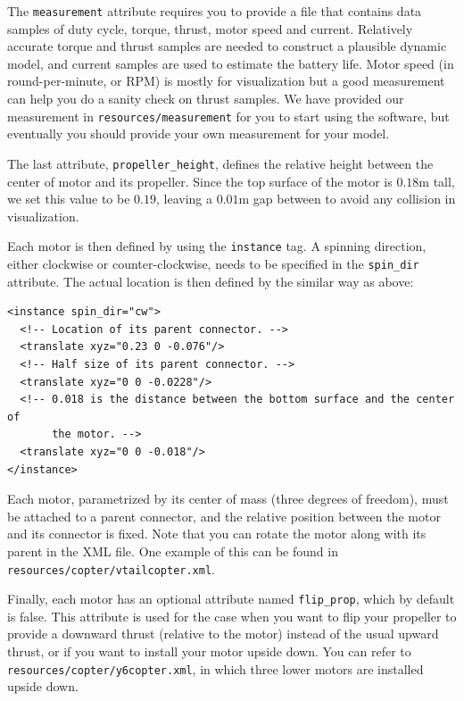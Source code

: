 The \texttt{measurement} attribute requires you to provide a file that contains data samples of duty cycle, torque, thrust, motor speed and current. Relatively accurate torque and thrust samples are needed to construct a plausible dynamic model, and current samples are used to estimate the battery life. Motor speed (in round-per-minute, or RPM) is mostly for visualization but a good measurement can help you do a sanity check on thrust samples. We have provided our measurement in \texttt{resources/measurement} for you to start using the software, but eventually you should provide your own measurement for your model.

The last attribute, \texttt{propeller\_height}, defines the relative height between the center of motor and its propeller. Since the top surface of the motor is $0.18$m tall, we set this value to be $0.19$, leaving a $0.01$m gap between to avoid any collision in visualization.

Each motor is then defined by using the \texttt{instance} tag. A spinning direction, either clockwise or counter-clockwise, needs to be specified in the \texttt{spin\_dir} attribute. The actual location is then defined by the similar way as above:
\begin{verbatim}
<instance spin_dir="cw">
  <!-- Location of its parent connector. -->
  <translate xyz="0.23 0 -0.076"/>
  <!-- Half size of its parent connector. -->
  <translate xyz="0 0 -0.0228"/>
  <!-- 0.018 is the distance between the bottom surface and the center of
       the motor. -->
  <translate xyz="0 0 -0.018"/>
</instance>
\end{verbatim}

Each motor, parametrized by its center of mass (three degrees of freedom), must be attached to a parent connector, and the relative position between the motor and its connector is fixed. Note that you can rotate the motor along with its parent in the XML file. One example of this can be found in \texttt{resources/copter/vtailcopter.xml}.

Finally, each motor has an optional attribute named \texttt{flip\_prop}, which by default is false. This attribute is used for the case when you want to flip your propeller to provide a downward thrust (relative to the motor) instead of the usual upward thrust, or if you want to install your motor upside down. You can refer to \texttt{resources/copter/y6copter.xml}, in which three lower motors are installed upside down.